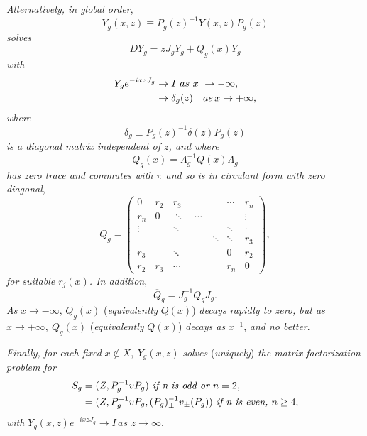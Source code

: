 \documentclass{surv-l}
\theoremstyle{plain}
\theoremstyle{definition}
\numberwithin{equation}{chapter}
\begin{document}
\emph{Alternatively, in global order},
\begin{equation*}
Y_{g}(x, z)\equiv P_{g}(z)^{-1}Y(x, z)P_{g}(z)
\end{equation*}
\emph{solves}
\begin{equation}\label{eq38.35}
DY_{g}=zJ_{g}Y_{g}+ Q_{g}(x)Y_{g}
\end{equation}
\emph{with}
\begin{align}\label{eq38.36}
Y_{g}e^{-ixzJ_{g}}&\rightarrow I\ as\ x\ \rightarrow-\infty,\\
&\rightarrow \delta_{g}(z)\quad as \,x\rightarrow+\infty,\notag
\end{align}
\emph{where}
\begin{equation}\label{eq38.37}
\delta_{g}\equiv P_{g}(z)^{-1}\delta(z)P_{g}(z)
\end{equation}
\emph{is a diagonal matrix independent of $z$, and where}
\begin{equation}\label{eq38.38}
Q_{g}(x)=\Lambda_{g}^{-1}Q(x)\Lambda_{g}
\end{equation}
\emph{has zero trace and commutes with $\pi$ and so is in circulant form with zero diagonal},
\begin{equation*}
Q_{g}=\left(\begin{array}{ccccc}
0 & r_{2} & r_{3} & \cdots & r_{n}\\
r_{n} & 0 & \ddots\quad\cdots & \quad & \vdots\\
\vdots & \quad & \ddots & \ddots & \cdot\\
\quad & \quad &\quad\quad\qquad \ddots&\ddots & r_{3}\\
r_{3} & \quad & \ddots & 0 & r_{2}\\
r_{2} & r_{3} & \cdots & r_{n} & 0
\end{array}\right),
\end{equation*}
\emph{for suitable $r_{j}(x)$. In addition},
\begin{equation}\label{eq38.39}
\overline{Q}_{g}=J_{g}^{-1}Q_{g}J_{g}.
\end{equation}
\emph{As} $x\rightarrow-\infty,\, Q_{g}(x)$ (\emph{equivalently} $Q(x)$) \emph{decays rapidly to zero, but as} $x \rightarrow+\infty,\ Q_{g}(x)$ (\emph{equivalently} $Q(x)$) \emph{decays as} $x^{-1}$, \emph{and no better}.

\emph{Finally, for each fixed} $x\not\in X,\ Y_{g}(x, z)$ \emph{solves} (\emph{uniquely}) \emph{the matrix factorization problem for}
\begin{align*}
S_{g}&=(Z,P_{g}^{-1}vP_{g})\emph{ if n is odd or } n=2,\\
&= (Z, P_{g}^{-1}vP_{g},(P_{g})_{\pm}^{-1}v_{\pm}(P_{g})) \emph{ if n is even, }n \geq 4,
\end{align*}
\emph{with} $Y_{g}(x, z)e^{-ixzJ_{g}}\rightarrow I\,as$ $z\rightarrow\infty$.
\end{document}
